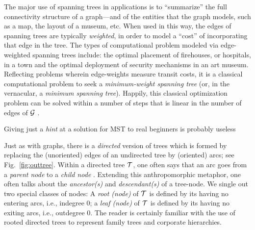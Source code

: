 The major use of spanning trees in applications is to ``summarize''
the full connectivity structure of a graph---and of the entities that
the graph models, such as a map, the layout of a museum, etc.  When
used in this way, the edges of spanning trees are typically {\em
  weighted},  in order to
model a ``cost'' of incorporating that edge in the tree.  The types of
computational problem modeled via edge-weighted spanning trees
include: the optimal placement of firehouses, or hospitals, in a town
and the optimal deployment of security mechanisms in an art museum.
Reflecting problems wherein edge-weights measure transit costs, it is
a classical computational problem to seek a {\em minimum-weight
  spanning tree} 
 (or, in the vernacular, a {\em
  minimum spanning tree}).  Happily, this classical optimization
problem can be solved within a number of steps that is linear in the
number of edges of $\mbox{$\cal G$}$ \cite{CLRS}.

{\Arny Giving just a {\em hint} at a solution for MST to real
  beginners is probably useless}

Just as with graphs, there is a {\em directed} version of trees which
is formed by replacing the (unoriented) edges of an undirected tree by
(oriented) arcs; see Fig.~\ref{fig:outtree}.  Within a directed tree
$\mbox{$\cal T$}$, one often says that an arc goes from a {\it parent node}
 to a {\it child node} .  Extending this anthropomorphic metaphor, one often talks
about the {\it ancestor(s)}  and {\it
  descendant(s)}  of a tree-node.  We
single out two special classes of nodes: A {\it root (node)}
  of $\mbox{$\cal T$}$ is
defined by its having no entering arcs, i.e., indegree $0$; a {\it
  leaf (node)}   of $\mbox{$\cal T$}$ is defined by its having no exiting arcs, i.e.,
outdegree $0$.  The reader is certainly familiar with the use of
rooted directed trees to represent family trees and corporate
hierarchies.

